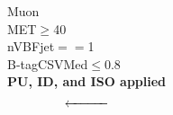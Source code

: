 \begin{frame}
\begin{columns}[T]
{			Muon\\MET$\ge$40\\nVBFjet$==$1\\B-tagCSVMed$\le 0.8$\\{\bf PU, ID, and ISO applied}}\\
			\[ \xleftarrow{\hspace*{1cm}} \]
	\end{columns}
\end{frame}
